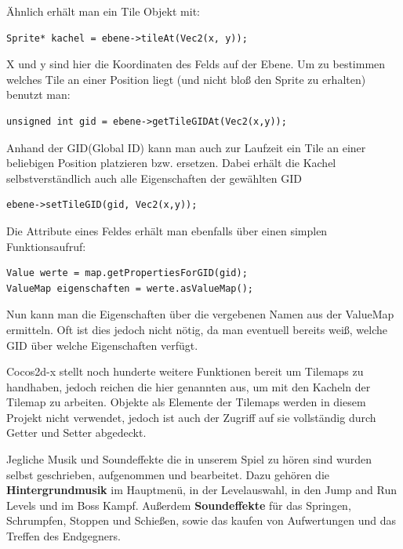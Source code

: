 Ähnlich erhält man ein Tile Objekt mit:

\begin{lstlisting}[style=singleline]
Sprite* kachel = ebene->tileAt(Vec2(x, y));
\end{lstlisting}

X und y sind hier die Koordinaten des Felds auf der Ebene.
Um zu bestimmen welches Tile an einer Position liegt (und nicht bloß den Sprite zu erhalten) benutzt man:

\begin{lstlisting}[style=singleline]
unsigned int gid = ebene->getTileGIDAt(Vec2(x,y));
\end{lstlisting}

Anhand der GID(Global ID) kann man auch zur Laufzeit ein Tile an einer beliebigen Position platzieren bzw. ersetzen. Dabei erhält die Kachel selbstverständlich auch alle Eigenschaften der gewählten GID	

\begin{lstlisting}[style=singleline]
ebene->setTileGID(gid, Vec2(x,y));
\end{lstlisting}

Die Attribute eines Feldes erhält man ebenfalls über einen simplen Funktionsaufruf:

\begin{lstlisting}[style=singleline]
Value werte = map.getPropertiesForGID(gid);
ValueMap eigenschaften = werte.asValueMap();
\end{lstlisting}

Nun kann man die Eigenschaften über die vergebenen Namen aus der ValueMap ermitteln. Oft ist dies jedoch nicht nötig, da man eventuell bereits weiß, welche GID über welche Eigenschaften verfügt.

Cocos2d-x stellt noch hunderte weitere Funktionen bereit um Tilemaps zu handhaben, jedoch reichen die hier genannten aus, um mit den Kacheln der Tilemap zu arbeiten. Objekte als Elemente der Tilemaps werden in diesem Projekt nicht verwendet, jedoch ist auch der Zugriff auf sie vollständig durch Getter und Setter abgedeckt.



\label{sec:2_Musik}
Jegliche Musik und Soundeffekte die in unserem Spiel \gamename zu hören sind wurden selbst geschrieben, aufgenommen und bearbeitet. Dazu gehören die
\textbf{Hintergrundmusik} im Hauptmenü, in der Levelauswahl, in den Jump and Run Levels und im Boss Kampf. Außerdem \textbf{Soundeffekte} für das Springen, Schrumpfen, Stoppen und Schießen, sowie das kaufen von Aufwertungen und das Treffen des Endgegners.



